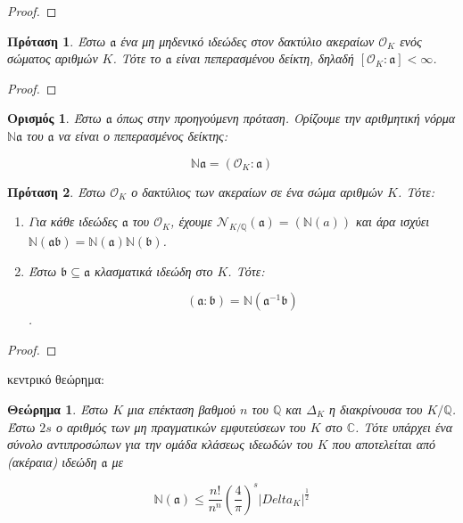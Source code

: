 \documentclass[oneside,a4paper]{article}
\newtheorem{theorem}{Θεώρημα}
\newtheorem*{defn}{Ορισμός}
\newtheorem{prop}{Πρόταση}
\newcommand{\Q}{\mathbb{Q}}
\begin{document}
\begin{proof}
\end{proof}



\begin{prop} Έστω $\mathfrak{a}$ ένα μη μηδενικό ιδεώδες στον δακτύλιο ακεραίων $\mathcal{O}_K$ ενός σώματος αριθμών $K$. Τότε το $\mathfrak{a}$ είναι πεπερασμένου δείκτη, δηλαδή $[\mathcal{O}_K : \mathfrak{a}] <\infty$.

\end{prop}

\begin{proof}
\end{proof}


\begin{defn}
	Έστω $\mathfrak{a}$ όπως στην προηγούμενη πρόταση. Ορίζουμε την αριθμητική νόρμα $\mathbb{N}\mathfrak{a}$ του $\mathfrak{a}$ να είναι ο πεπερασμένος δείκτης:

	$$\mathbb{N}\mathfrak{a} = (\mathcal{O}_K : \mathfrak{a})$$
\end{defn}


\begin{prop}
	Έστω $\mathcal{O}_K$ ο δακτύλιος των ακεραίων σε ένα σώμα αριθμών $K$. Τότε:
	\begin{enumerate}
		\item Για κάθε ιδεώδες $\mathfrak{a}$ του $\mathcal{O}_K$, έχουμε $\mathcal{N}_{K/\Q} (\mathfrak{a}) = (\mathbb{N}(a))$ και άρα ισχύει $\mathbb{N}(\mathfrak{a} \mathfrak{b}) = \mathbb{N}(\mathfrak{a}) \mathbb{N}(\mathfrak{b})$.
		\item Έστω $\mathfrak{b} \subseteq \mathfrak{a}$ κλασματικά ιδεώδη στο $K$. Τότε:
		
		$$ (\mathfrak{a}: \mathfrak{b}) = \mathbb{N}(\mathfrak{a}^{-1} \mathfrak{b})$$.
	\end{enumerate}
\end{prop}


\begin{proof} %
\end{proof}


κεντρικό θεώρημα:

\begin{theorem}
	Έστω $K$ μια επέκταση βαθμού $n$ του $\Q$ και $\Delta_K$ η διακρίνουσα του $K/\Q$. Έστω $2s$ ο αριθμός των μη πραγματικών εμφυτεύσεων του $K$ στο $\mathbb{C}$. Τότε υπάρχει ένα σύνολο αντιπροσώπων για την ομάδα κλάσεως ιδεωδών του $K$ που αποτελείται από (ακέραια) ιδεώδη $\mathfrak{a}$ με 

	$$\mathbb{N}(\mathfrak{a}) \leq \frac{n!}{n^n} \left(\frac{4}{\pi}\right)^s |Delta_K|^{\frac{1}{2}}$$
\end{theorem}
\end{document}
